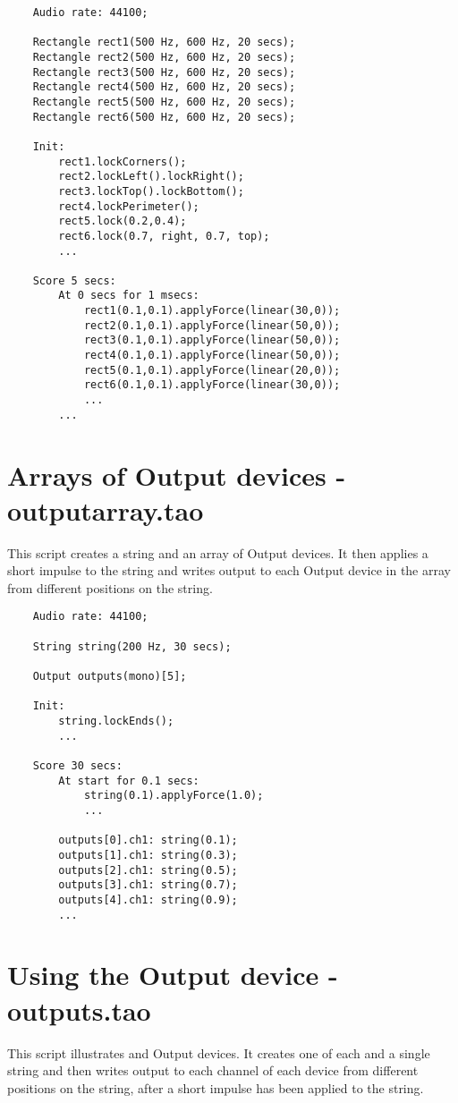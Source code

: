 \begin{verbatim}
    Audio rate: 44100;
        
    Rectangle rect1(500 Hz, 600 Hz, 20 secs);
    Rectangle rect2(500 Hz, 600 Hz, 20 secs);
    Rectangle rect3(500 Hz, 600 Hz, 20 secs);
    Rectangle rect4(500 Hz, 600 Hz, 20 secs);
    Rectangle rect5(500 Hz, 600 Hz, 20 secs);
    Rectangle rect6(500 Hz, 600 Hz, 20 secs);
        
    Init:
        rect1.lockCorners();
        rect2.lockLeft().lockRight();
        rect3.lockTop().lockBottom();
        rect4.lockPerimeter();
        rect5.lock(0.2,0.4);
        rect6.lock(0.7, right, 0.7, top);
        ...
        
    Score 5 secs:
        At 0 secs for 1 msecs:
            rect1(0.1,0.1).applyForce(linear(30,0));
            rect2(0.1,0.1).applyForce(linear(50,0));
            rect3(0.1,0.1).applyForce(linear(50,0));
            rect4(0.1,0.1).applyForce(linear(50,0));
            rect5(0.1,0.1).applyForce(linear(20,0));
            rect6(0.1,0.1).applyForce(linear(30,0));
            ...
        ...
\end{verbatim}
 
\section{Arrays of Output devices - outputarray.tao}
This script creates a string and an array of Output devices. It then
applies a short impulse to the string and writes output to each Output
device in the array from different positions on the string.

\begin{verbatim}
    Audio rate: 44100;
        
    String string(200 Hz, 30 secs);
        
    Output outputs(mono)[5];
        
    Init:
        string.lockEnds();
        ...
        
    Score 30 secs:
        At start for 0.1 secs:
            string(0.1).applyForce(1.0);
            ...
        
        outputs[0].ch1: string(0.1);
        outputs[1].ch1: string(0.3);
        outputs[2].ch1: string(0.5);
        outputs[3].ch1: string(0.7);
        outputs[4].ch1: string(0.9);
        ...
\end{verbatim}
 
\section{Using the Output device - outputs.tao}
This script illustrates  and  Output
devices. It creates one of each and a single string and then writes output
to each channel of each device from different positions on the string,
after a short impulse has been applied to the string.

